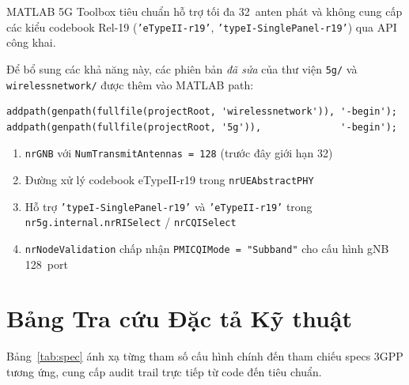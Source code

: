 \documentclass[12pt, a4paper]{article}
\newcommand{\param}[1]{\texttt{#1}}
\begin{document}
MATLAB 5G Toolbox tiêu chuẩn hỗ trợ tối đa 32~anten phát và không
cung cấp các kiểu codebook Rel-19 (\param{'eTypeII-r19'},
\param{'typeI-SinglePanel-r19'}) qua API công khai.

Để bổ sung các khả năng này, các phiên bản \emph{đã sửa} của
thư viện \texttt{5g/} và \texttt{wirelessnetwork/} được thêm vào
MATLAB path:
\begin{lstlisting}
addpath(genpath(fullfile(projectRoot, 'wirelessnetwork')), '-begin');
addpath(genpath(fullfile(projectRoot, '5g')),              '-begin');
\end{lstlisting}

\begin{enumerate}[nosep]
  \item \texttt{nrGNB} với \param{NumTransmitAntennas = 128}
        (trước đây giới hạn 32)
  \item Đường xử lý codebook eTypeII-r19 trong \texttt{nrUEAbstractPHY}
  \item Hỗ trợ \param{'typeI-SinglePanel-r19'} và \param{'eTypeII-r19'}
        trong \texttt{nr5g.internal.nrRISelect} / \texttt{nrCQISelect}
  \item \texttt{nrNodeValidation} chấp nhận \param{PMICQIMode = "Subband"}
        cho cấu hình gNB 128~port
\end{enumerate}

\section{Bảng Tra cứu Đặc tả Kỹ thuật}

Bảng~\ref{tab:spec} ánh xạ từng tham số cấu hình chính đến tham chiếu
specs 3GPP tương ứng, cung cấp audit trail trực tiếp từ code đến
tiêu chuẩn.
\end{document}
